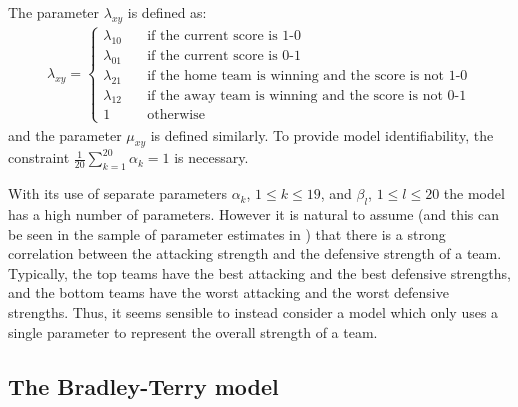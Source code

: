 The parameter \(\lambda_{xy}\) is defined as:
\begin{align}
\lambda_{xy} = \left \{
\begin{array}{ll}
\lambda_{10} \quad &\text{if the current score is 1-0}\\
\lambda_{01} \quad &\text{if the current score is 0-1}\\
\lambda_{21} \quad &\text{if the home team is winning and the score is not 1-0}\\
\lambda_{12} \quad &\text{if the away team is winning and the score is not 0-1}\\
1 			 \quad &\text{otherwise}
\end{array} \right.
\end{align}
and the parameter \(\mu_{xy}\) is defined similarly. To provide model identifiability, the constraint \(\frac{1}{20}
\sum_{k=1}^{20} \alpha_k = 1\) is necessary.
 
With its use of separate parameters \(\alpha_k\), \(1 \leq k \leq 19\), and \(\beta_l\), \(1 \leq l \leq 20\) the
model has a high number of parameters. However it is natural to assume (and this can be seen in the sample of parameter
estimates in \cite{DixonRobinson1998}) that there is a strong correlation between the attacking strength and the
defensive strength of a team. Typically, the top teams have the best attacking and the best defensive strengths, and the
bottom teams have the worst attacking and the worst defensive strengths. Thus, it seems sensible to instead consider a
model which only uses a single parameter to represent the overall strength of a team.

\subsection{The Bradley-Terry model} 
\label{BTC}

